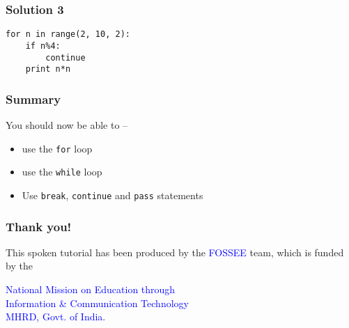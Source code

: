 \documentclass[presentation]{beamer}
\begin{document}
\begin{frame}[fragile]
\frametitle{Solution 3}
\label{sec-7}

\begin{verbatim}
for n in range(2, 10, 2):
    if n%4:
        continue      
    print n*n
\end{verbatim}
\end{frame}
\begin{frame}
\frametitle{Summary}
\label{sec-8}

  You should now be able to --
\begin{itemize}
\item use the \texttt{for} loop
\item use the \texttt{while} loop
\item Use \texttt{break}, \texttt{continue} and \texttt{pass} statements
\end{itemize}
\end{frame}
\begin{frame}
\frametitle{Thank you!}
\label{sec-9}

  \begin{block}{}
  \begin{center}
  This spoken tutorial has been produced by the
  \textcolor{blue}{FOSSEE} team, which is funded by the 
  \end{center}
  \begin{center}
    \textcolor{blue}{National Mission on Education through \\
      Information \& Communication Technology \\ 
      MHRD, Govt. of India}.
  \end{center}  
  \end{block}
\end{frame}
\end{document}
